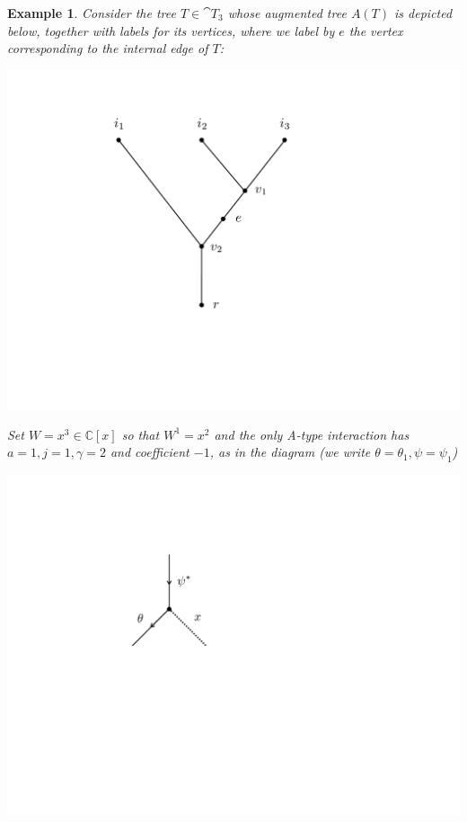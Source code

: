 \documentclass[english,letter paper,12pt,leqno]{article}
\theoremstyle{example}
\newtheorem{example}[theorem]{Example}
\numberwithin{equation}{section}
\begin{document}
\begin{example}\label{ex:picture_example} Consider the tree $T \in \cat{T}_3$ whose augmented tree $A(T)$ is depicted below, together with labels for its vertices, where we label by $e$ the vertex corresponding to the internal edge of $T$:
\begin{center}
\includegraphics[scale=0.25]{dia7}
\end{center}
Set $W = x^3 \in \mathbb{C}[x]$ so that $W^1 = x^2$ and the only A-type interaction has $a = 1, j = 1, \gamma = 2$ and coefficient $-1$, as in the diagram (we write $\theta = \theta_1, \psi = \psi_1$)
\begin{center}
\includegraphics[scale=0.3]{dia5}
\end{center}

\end{example}
\end{document}
